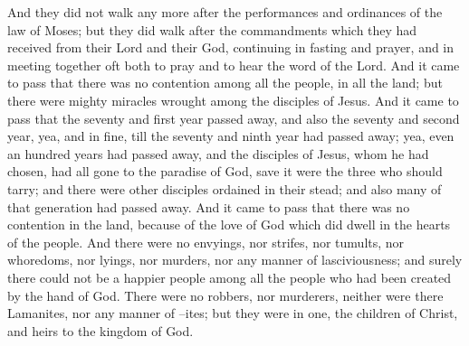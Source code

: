 And they did not walk any more after the performances and ordinances of the law of Moses; but they did walk after the commandments which they had received from their Lord and their God, continuing in fasting and prayer, and in meeting together oft both to pray and to hear the word of the Lord.
\bverse \iffalse And it came to pass that there was no contention among all the people, in all the land; but there were mighty miracles wrought among the disciples of Jesus. \fi
And it came to pass that there was no contention among all the people, in all the land; but there were mighty miracles wrought among the disciples of Jesus.
\bverse \iffalse And it came to pass that the seventy and first year passed away, and also the seventy and second year, yea, and in fine, till the seventy and ninth year had passed away; yea, even an hundred years had passed away, and the disciples of Jesus, whom he had chosen, had all gone to the paradise of God, save it were the three who should tarry; and there were other disciples ordained in their stead; and also many of that generation had passed away. \fi
And it came to pass that the seventy and first year passed away, and also the seventy and second year, yea, and in fine, till the seventy and ninth year had passed away; yea, even an hundred years had passed away, and the disciples of Jesus, whom he had chosen, had all gone to the paradise of God, save it were the three who should tarry; and there were other disciples ordained in their stead; and also many of that generation had passed away.
\bverse \iffalse And it came to pass that there was no contention in the land, because of the love of God which did dwell in the hearts of the people. \fi
And it came to pass that there was no contention in the land, because of the love of God which did dwell in the hearts of the people.
\bverse \iffalse And there were no envyings, nor strifes, nor tumults, nor whoredoms, nor lyings, nor murders, nor any manner of lasciviousness; and surely there could not be a happier people among all the people who had been created by the hand of God. \fi
And there were no envyings, nor strifes, nor tumults, nor whoredoms, nor lyings, nor murders, nor any manner of lasciviousness; and surely there could not be a happier people among all the people who had been created by the hand of God.
\bverse \iffalse There were no robbers, nor murderers, neither were there Lamanites, nor any manner of --ites; but they were in one, the children of Christ, and heirs to the kingdom of God. \fi
There were no robbers, nor murderers, neither were there Lamanites, nor any manner of --ites; but they were in one, the children of Christ, and heirs to the kingdom of God.
